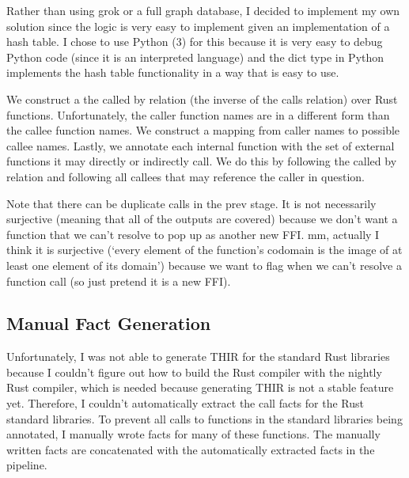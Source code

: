 \documentclass[11pt]{article}
\begin{document}
Rather than using grok or a full graph database, I decided to implement my own solution since the logic is very easy to implement given an implementation of a hash table.
I chose to use Python (3) for this because it is very easy to debug Python code (since it is an interpreted language) and the dict type in Python implements the hash table functionality in a way that is easy to use.

We construct a the called by relation (the inverse of the calls relation) over Rust functions.
Unfortunately, the caller function names are in a different form than the callee function names.
We construct a mapping from caller names to possible callee names.
Lastly, we annotate each internal function with the set of external functions it may directly or indirectly call.
We do this by following the called by relation and following all callees that may reference the caller in question.

Note that there can be duplicate calls in the prev stage.
It is not necessarily surjective (meaning that all of the outputs are covered) because we don't want a function that we can't resolve to pop up as another new FFI.
mm, actually I think it is surjective (`every element of the function's codomain is the image of at least one element of its domain') because we want to flag when we can't resolve a function call (so just pretend it is a new FFI).


\subsection{Manual Fact Generation}

Unfortunately, I was not able to generate THIR for the standard Rust libraries because I couldn't figure out how to build the Rust compiler with the nightly Rust compiler, which is needed because generating THIR is not a stable feature yet.
Therefore, I couldn't automatically extract the call facts for the Rust standard libraries.
To prevent all calls to functions in the standard libraries being annotated, I manually wrote facts for many of these functions.
The manually written facts are concatenated with the automatically extracted facts in the pipeline.
\end{document}
